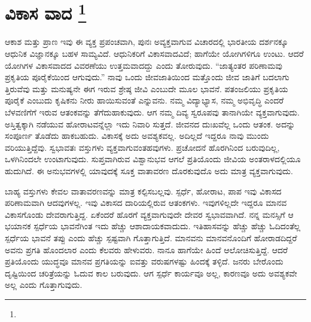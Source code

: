 
\chapter[ವಿಕಾಸ ವಾದ ]{ವಿಕಾಸ ವಾದ \protect\footnote{}}

ಆಕಾಶ ಮತ್ತು ಪ್ರಾಣ ಇವು ಈ ವ್ಯಕ್ತ ಪ್ರಪಂಚವಾಗಿ, ಪುನಃ ಅವ್ಯಕ್ತವಾಗುವ ವಿಚಾರದಲ್ಲಿ ಭಾರತೀಯ ದರ್ಶನಕ್ಕೂ ಆಧುನಿಕ ವಿಜ್ಞಾನಕ್ಕೂ ಬಹಳ ಸಾಮ್ಯವಿದೆ. ಆಧುನಿಕರಿಗೆ ವಿಕಾಸವಾದವಿದೆ; ಹಾಗೆಯೇ ಯೋಗಿಗಳಿಗೂ ಉಂಟು. ಆದರೆ ಯೋಗಿಗಳ ವಿಕಾಸವಾದದ ವಿವರಣೆಯು ಉತ್ತಮವಾದದ್ದು ಎಂದು ತೋರುವುದು. “ಜಾತ್ಯಂತರ ಪರಿಣಾಮವು ಪ್ರಕೃತಿಯ ಪೂರೈಕೆಯಿಂದ ಆಗುವುದು.” ನಾವು ಒಂದು ಜೀವಜಾತಿಯಿಂದ ಮತ್ತೊಂದು ಜೀವ ಜಾತಿಗೆ ಬದಲಾಗು ತ್ತಿರುವೆವು ಮತ್ತು ಮನುಷ್ಯನೇ ಈಗ ಇರುವ ಶ್ರೇಷ್ಠ ಜೀವಿ ಎಂಬುದೇ ಮೂಲ ಭಾವನೆ. ಪತಂಜಲಿಯು ಪ್ರಕೃತಿಯ ಪೂರೈಕೆ ಎಂಬುದು ಕೃಷಿಕನು ನೀರು ಹಾಯಿಸುವಂತೆ ಎನ್ನುವನು. ನಮ್ಮ ವಿದ್ಯಾಭ್ಯಾಸ, ನಮ್ಮ ಅಭಿವೃದ್ಧಿ ಎಂದರೆ ಬೆಳವಣಿಗೆಗೆ ಇರುವ ಆತಂಕವನ್ನು ತೆಗೆದುಹಾಕುವುದು. ಆಗ ನಮ್ಮ ದಿವ್ಯ ಸ್ವರೂಪವು ತಾನಾಗಿಯೇ ವ್ಯಕ್ತವಾಗುವುದು. ಅಸ್ತಿತ್ವಕ್ಕಾಗಿ ನಡೆಯುವ ಹೋರಾಟವನ್ನೆಲ್ಲಾ ಇದು ನಿವಾರಿ ಸುತ್ತದೆ. ಜೀವನದ ದುಃಖವೆಲ್ಲ ಒಂದು ಆತಂಕ. ಅದನ್ನು ಸಂಪೂರ್ಣ ತೊಡೆದು ಹಾಕಬಹುದು. ವಿಕಾಸಕ್ಕೆ ಅದು ಅವಶ್ಯಕವಲ್ಲ. ಅದಿಲ್ಲದೆ ಇದ್ದರೂ ನಾವು ಮುಂದು ವರಿಯುತ್ತಿದ್ದೆವು. ಸ್ವಭಾವತಃ ವಸ್ತುಗಳು ವ್ಯಕ್ತವಾಗುವಂತಹವುಗಳು. ಪ್ರಚೋದನೆ ಹೊರಗಿನಿಂದ ಬರುವುದಿಲ್ಲ, ಒಳಗಿನಿಂದಲೇ ಉಂಟಾಗುವುದು. ಸುಪ್ತವಾಗಿರುವ ವಿಶ್ವಾನುಭವ ಆಗಲೆ ಪ್ರತಿಯೊಂದು ಜೀವಿಯ ಅಂತರಾಳದಲ್ಲಿಯೂ ಹುದುಗಿದೆ. ಈ ಅನುಭವಗಳಲ್ಲಿ ಯಾವುದಕ್ಕೆ ಸೂಕ್ತ ವಾತಾವರಣ ದೊರಕುವುದೊ ಅದು ಮಾತ್ರ ವ್ಯಕ್ತವಾಗುವುದು.

ಬಾಹ್ಯ ವಸ್ತುಗಳು ಕೇವಲ ವಾತಾವರಣವನ್ನು ಮಾತ್ರ ಕಲ್ಪಿಸಬಲ್ಲವು. ಸ್ಪರ್ಧೆ, ಹೋರಾಟ, ಪಾಪ ಇವು ವಿಕಾಸದ ಪರಿಣಾಮವಾಗಿ ಆದವುಗಳಲ್ಲ. ಇವು ವಿಕಾಸದ ದಾರಿಯಲ್ಲಿರುವ ಆತಂಕಗಳು. ಇವುಗಳಿಲ್ಲದೇ ಇದ್ದರೂ ಮಾನವ ವಿಕಾಸಗೊಂಡು ದೇವರಾಗುತ್ತಿದ್ದ. ಏಕೆಂದರೆ ಹೊರಗೆ ವ್ಯಕ್ತವಾಗುವುದೇ ದೇವರ ಸ್ವಭಾವವಾಗಿದೆ. ನನ್ನ ಮನಸ್ಸಿಗೆ ಆ ಭಯಾನಕ ಸ್ಪರ್ಧೆಯ ಭಾವನೆಗಿಂತ ಇದು ಹೆಚ್ಚು ಆಶಾದಾಯಕವಾದುದು. ಇತಿಹಾಸವನ್ನು ಹೆಚ್ಚು ಹೆಚ್ಚು ಓದಿದಂತೆಲ್ಲ ಸ್ಪರ್ಧೆಯ ಭಾವನೆ ತಪ್ಪು ಎಂದು ಹೆಚ್ಚು ಸ್ಪಷ್ಟವಾಗಿ ಗೊತ್ತಾಗುತ್ತಿದೆ. ಮಾನವನು ಮಾನವನೊಂದಿಗೆ ಹೋರಾಡದಿದ್ದರೆ ಅವನು ಪ್ರಗತಿ ಹೊಂದಲಾರ ಎಂದು ಕೆಲವರು ಹೇಳುವರು. ನಾನೂ ಹಾಗೆಯೇ ಹಿಂದೆ ಆಲೋಚಿಸುತ್ತಿದ್ದೆ. ಆದರೆ ಪ್ರತಿಯೊಂದು ಯುದ್ಧವೂ ಮಾನವ ಪ್ರಗತಿಯನ್ನು ಐವತ್ತು ವರುಷಗಳಷ್ಟು ಹಿಂದಕ್ಕೆ ತಳ್ಳಿದೆ. ಜನರು ಬೇರೊಂದು ದೃಷ್ಟಿಯಿಂದ ಚರಿತ್ರೆಯನ್ನು ಓದುವ ಕಾಲ ಬರುವುದು. ಆಗ ಸ್ಪರ್ಧೆ ಕಾರ್ಯವೂ ಅಲ್ಲ, ಕಾರಣವೂ ಅದು ಅವಶ್ಯಕವೇ ಅಲ್ಲ ಎಂದು ಗೊತ್ತಾಗುವುದು.

